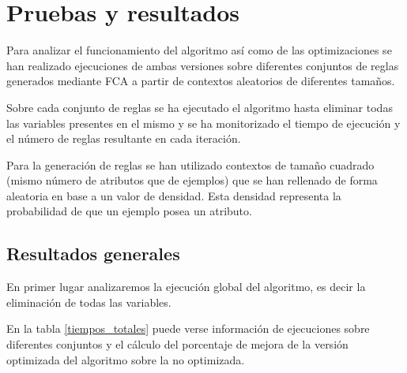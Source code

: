 \chapter*{Pruebas y resultados}
	
	Para analizar el funcionamiento del algoritmo así como de las optimizaciones se han realizado ejecuciones de ambas versiones sobre diferentes conjuntos de reglas generados mediante FCA a partir de contextos aleatorios de diferentes tamaños. 
	
	Sobre cada conjunto de reglas se ha ejecutado el algoritmo hasta eliminar todas las variables presentes en el mismo y se ha monitorizado el tiempo de ejecución y el número de reglas resultante en cada iteración.	
	
	Para la generación de reglas se han utilizado contextos de tamaño cuadrado (mismo número de atributos que de ejemplos) que se han rellenado de forma aleatoria en base a un valor de densidad. Esta densidad representa la probabilidad de que un ejemplo posea un atributo.


\section*{Resultados generales}

	En primer lugar analizaremos la ejecución global del algoritmo, es decir la eliminación de todas las variables. 
	
	En la tabla \ref{tiempos_totales} puede verse información de ejecuciones sobre diferentes conjuntos y el cálculo del porcentaje de mejora de la versión optimizada del algoritmo sobre la no optimizada.

